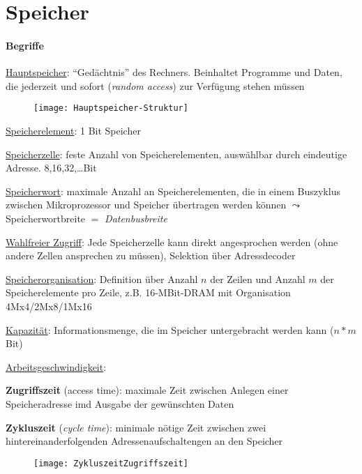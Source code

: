 \section{Speicher}
\label{sec:speicher}

\paragraph{Begriffe}
\begin{items}
	\item \underline{Hauptspeicher}: "`Gedächtnis"' des Rechners. Beinhaltet Programme und Daten, die jederzeit und sofort (\emph{random access}) zur Verfügung stehen müssen
	\begin{figure}[H]\centering\label{Hauptspeicher-Struktur}\texttt{[image: Hauptspeicher-Struktur]}\end{figure}

	\item \underline{Speicherelement}: 1 Bit Speicher

	\item \underline{Speicherzelle}: feste Anzahl von Speicherelementen, auswählbar durch eindeutige Adresse. 8,16,32,\dots Bit

	\item \underline{Speicherwort}: maximale Anzahl an Speicherelementen, die in einem Buszyklus zwischen Mikroprozessor und Speicher übertragen werden können \( \leadsto \) Speicherwortbreite \( = \) \emph{Datenbusbreite}

	\item \underline{Wahlfreier Zugriff}: Jede Speicherzelle kann direkt angesprochen werden (ohne andere Zellen ansprechen zu müssen), Selektion über Adressdecoder

	\item \underline{Speicherorganisation}: Definition über Anzahl \( n \) der Zeilen und Anzahl \( m \) der Speicherelemente pro Zeile, z.B. 16-MBit-DRAM mit Organisation 4Mx4/2Mx8/1Mx16

	\item \underline{Kapazität}: Informationsmenge, die im Speicher untergebracht werden kann (\( n*m \) Bit)

	\item \underline{Arbeitsgeschwindigkeit}:
	\begin{enumeration}
		\item \textbf{Zugriffszeit} (\emph{}access time): maximale Zeit zwischen Anlegen einer Speicheradresse imd Ausgabe der gewünschten Daten

		\item \textbf{Zykluszeit} (\emph{cycle time}): minimale nötige Zeit zwischen zwei hintereinanderfolgenden Adressenaufschaltengen an den Speicher

		\begin{figure}[H]\centering\label{ZykluszeitZugriffszeit}\texttt{[image: ZykluszeitZugriffszeit]}\end{figure}
	\end{enumeration}
\end{items}

